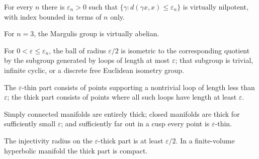 \begin{theorem}
\label{thm:chow-iv-margulis-algebraic}
For every \(n\) there is \(\varepsilon_n>0\) such that
\(\{\gamma:d(\gamma x,x)\le\varepsilon_n\}\) is virtually nilpotent, with
index bounded in terms of \(n\) only.
\end{theorem}

\begin{remark}
\label{rem:chow-iv-margulis-three-dimensional}
For \(n=3\), the Margulis group is virtually abelian.
\end{remark}

\begin{theorem}
\label{thm:chow-iv-margulis-local}
For \(0<\varepsilon\le\varepsilon_n\), the ball of radius \(\varepsilon/2\) is
isometric to the corresponding quotient by the subgroup generated by loops of
length at most \(\varepsilon\); that subgroup is trivial, infinite cyclic, or
a discrete free Euclidean isometry group.
\end{theorem}

\begin{definition}
\label{def:chow-iv-thick-thin-parts}
The \(\varepsilon\)-thin part consists of points supporting a nontrivial loop
of length less than \(\varepsilon\); the thick part consists of points where
all such loops have length at least \(\varepsilon\).
\end{definition}

\begin{example}
\label{ex:chow-iv-thick-thin-examples}
Simply connected manifolds are entirely thick; closed manifolds are thick for
sufficiently small \(\varepsilon\); and sufficiently far out in a cusp every
point is \(\varepsilon\)-thin.
\end{example}

\begin{lemma}
\label{lem:chow-iv-thick-injectivity-radius}
The injectivity radius on the \(\varepsilon\)-thick part is at least
\(\varepsilon/2\).  In a finite-volume hyperbolic manifold the thick part is
compact.
\end{lemma}

